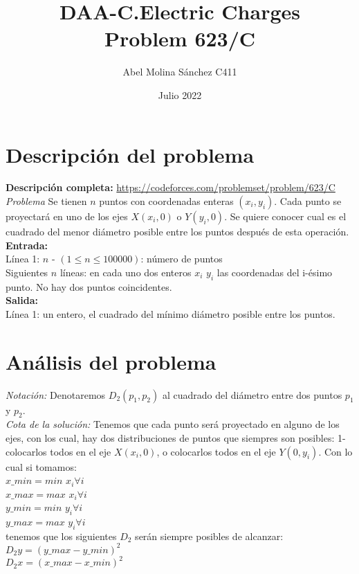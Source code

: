 \documentclass{article}
\title{DAA-C.Electric Charges\\
 Problem 623/C}
\author{Abel Molina S\'anchez C411}
\date{Julio 2022}
\begin{document}
\maketitle

\section{Descripci\'on del problema}

\textbf{Descripci\'on completa:} \url{https://codeforces.com/problemset/problem/623/C}\\

\textit{Problema} Se tienen $n$ puntos con coordenadas enteras $(x_i,y_i)$. Cada punto se proyectar\'a en uno de los ejes $X(x_i,0)$ o $Y(y_i,0)$. Se quiere conocer cual es el cuadrado del menor di\'ametro posible entre los puntos despu\'es de esta operaci\'on.\\

\textbf{Entrada:}\\

L\'inea 1: $n$ - $(1\leq n\leq 100000)$: n\'umero de puntos\\

Siguientes $n$ l\'ineas: en cada uno dos enteros $x_i$ $y_i$ las coordenadas del i-\'esimo punto. No hay dos puntos coincidentes.\\

\textbf{Salida:}\\

L\'inea 1: un entero, el cuadrado del m\'inimo di\'ametro posible entre los puntos.

\section{An\'alisis del problema}


\textit{Notaci\'on:} Denotaremos $D_2(p_1,p_2)$ al cuadrado del di\'ametro entre dos puntos $p_1$ y $p_2$. \\


\textit{Cota de la soluci\'on:} Tenemos que cada punto ser\'a proyectado en alguno de los ejes, con los cual, hay dos distribuciones de puntos que siempres son posibles: 1- colocarlos todos en el eje $X(x_i,0)$, o colocarlos todos en el eje $Y(0,y_i)$. Con lo cual si tomamos:\\ $x\_min= min$ $x_i \forall i$\\
$x\_max= max$ $x_i \forall i$\\
$y\_min= min$ $y_i \forall i$\\
$y\_max= max$ $y_i \forall i$\\
tenemos que los siguientes $D_2$ ser\'an siempre posibles de alcanzar:\\
$D_2y = (y\_max-y\_min)^2$\\
$D_2x = (x\_max-x\_min)^2$\\
\end{document}
